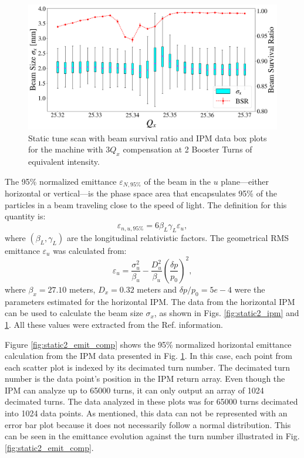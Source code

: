\begin{figure}[H]
    \centering
    \includegraphics[width=\columnwidth]{chapter4/static2turns_comp_ipm_dampersOFF.png}
    \caption{Static tune scan with beam survival ratio and IPM data box plots for the machine with $3Q_x$ compensation at 2 Booster Turns of equivalent intensity.}
    \label{fig:static2_ipm_comp}
\end{figure}

The 95\% normalized emittance $\varepsilon_{N,95\%}$ of the beam in the $u$ plane---either horizontal or vertical---is the phase space area that encapsulates 95\% of the particles in a beam traveling close to the speed of light. The definition for this quantity is:
\begin{equation}
    \label{eq:95emittance}
    \varepsilon_{n,u,95\%} = 6 \beta_L \gamma_L \varepsilon_u,
\end{equation}
where $(\beta_L,\gamma_L)$ are the longitudinal relativistic factors. The geometrical RMS emittance $\varepsilon_u$ was calculated from:
\begin{equation}
    \label{eq:emittance}
    \varepsilon_{u} = \frac{\sigma_u ^2}{\beta_u}-\frac{D_u^2}{\beta_u} \left( \frac{\delta p}{p_0}\right)^2,
\end{equation}
where $\beta_x=27.10$ meters, $D_x=0.32$ meters and $\delta p/p_0=5e-4$ were the parameters estimated for the horizontal IPM. The data from the horizontal IPM can be used to calculate the beam size $\sigma_x$, as shown in Figs. \ref{fig:static2_ipm} and \ref{fig:static2_ipm_comp}. All these values were extracted from the Ref. \cite{betiay} information.

Figure \ref{fig:static2_emit_comp} shows the 95\% normalized horizontal emittance calculation from the IPM data presented in Fig. \ref{fig:static2_ipm_comp}. In this case, each point from each scatter plot is indexed by its decimated turn number. The decimated turn number is the data point's position in the IPM return array. Even though the IPM can analyze up to 65000 turns, it can only output an array of 1024 decimated turns. The data analyzed in these plots was for 65000 turns decimated into 1024 data points. As mentioned, this data can not be represented with an error bar plot because it does not necessarily follow a normal distribution. This can be seen in the emittance evolution against the turn number illustrated in Fig. \ref{fig:static2_emit_comp}.  

